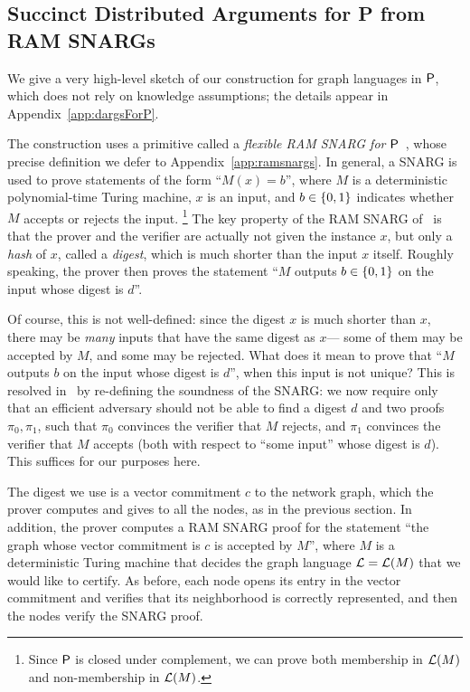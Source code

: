 \subsection{Succinct Distributed Arguments for P from RAM SNARGs}\label{sec:dargsForP}
We give a very high-level sketch of our construction for graph languages in ${\mathsf{P}}$,
which does not rely on knowledge assumptions; the details appear in Appendix~\ref{app:dargsForP}.

The construction uses a primitive called a \emph{flexible RAM SNARG for ${\mathsf{P}}$}~\cite{KP16,cryptoeprint:2022/1320},
whose precise definition we defer to Appendix~\ref{app:ramsnargs}.
In general, a %
SNARG is used to prove statements of the form ``$M(x) = b$'',
where $M$ is a deterministic polynomial-time Turing machine, $x$ is an input,
and $b \in \left \{{0,1} \right \}$ indicates whether $M$ accepts or rejects the input.%
\footnote{Since ${\mathsf{P}}$ is closed under complement, we can prove both membership in $\mathcal{L}(M)$
and non-membership in $\mathcal{L}(M)$.}
The key property of the RAM SNARG of~\cite{KP16,cryptoeprint:2022/1320} is that 
the prover and the verifier
are actually not given the instance $x$,
but only a \emph{hash} of $x$, called a \emph{digest},
which is much shorter than the input $x$ itself.
Roughly speaking, the prover then proves the statement ``$M$ outputs $b \in \left \{{0,1} \right \}$
on the input whose digest is $d$''.

Of course, this is not well-defined: since the digest $x$ is much shorter than $x$,
there may be \emph{many} inputs that have the same digest as $x$---%
some of them may be accepted by $M$, and some may be rejected.
What does it mean to prove that ``$M$ outputs $b$ on the input whose digest is $d$'',
when this input is not unique?
This is resolved in~\cite{KP16} by re-defining
the soundness of the SNARG:
we now require only that 
an
efficient adversary should not be able to find a digest $d$ and two proofs $\pi_0, \pi_1$,
such that $\pi_0$ convinces the verifier that $M$ rejects,
and $\pi_1$ convinces the verifier that $M$ accepts (both with respect to ``some input'' whose digest is $d$).
This suffices for our purposes here.

The digest we use is a vector commitment $c$ to the network graph, which the prover
computes and gives to all the nodes, as in the previous section.
In addition, the prover computes a RAM SNARG proof for the statement ``the graph whose vector commitment
is $c$ is accepted by $M$'', where $M$ is a deterministic Turing machine that decides
the graph language $\mathcal{L} = \mathcal{L}(M)$ that we would like to certify.
As before, each node opens its entry in the vector commitment and verifies that its neighborhood
is correctly represented, and then the nodes verify the SNARG proof.

